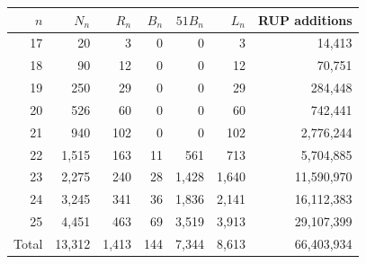 \begin{tabular}{@{}rrrrrrr@{}}
\toprule
$n$&$N_n$&$R_n$&$B_n$&$51B_n$&$L_n$&RUP additions\\
\midrule
17&20&3&0&0&3&14,413\\
18&90&12&0&0&12&70,751\\
19&250&29&0&0&29&284,448\\
20&526&60&0&0&60&742,441\\
21&940&102&0&0&102&2,776,244\\
22&1,515&163&11&561&713&5,704,885\\
23&2,275&240&28&1,428&1,640&11,590,970\\
24&3,245&341&36&1,836&2,141&16,112,383\\
25&4,451&463&69&3,519&3,913&29,107,399\\
\midrule
Total&13,312&1,413&144&7,344&8,613&66,403,934\\
\bottomrule
\end{tabular}
